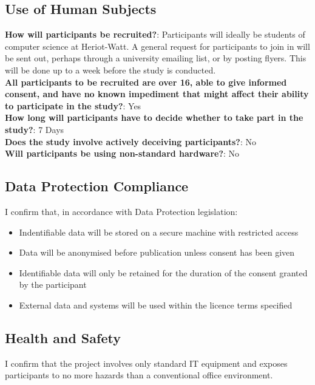 \documentclass[a4paper,11pt]{report}
\begin{document}
\subsection*{Use of Human Subjects}
\textbf{How will participants be recruited?}: Participants will ideally be students of computer science at Heriot-Watt. A general request for participants to join in will be sent out, perhaps through a university emailing list, or by posting flyers. This will be done up to a week before the study is conducted.\\
\textbf{All participants to be recruited are over 16, able to give informed consent, and have no known impediment that might affect their ability to participate in the study?}: Yes\\
\textbf{How long will participants have to decide whether to take part in the study?}: 7 Days\\
\textbf{Does the study involve actively deceiving participants?}: No\\
\textbf{Will participants be using non-standard hardware?}: No

\subsection*{Data Protection Compliance}
I confirm that, in accordance with Data Protection legislation:
\begin{itemize}
\item Indentifiable data will be stored on a secure machine with restricted access
\item Data will be anonymised before publication unless consent has been given
\item Identifiable data will only be retained for the duration of the consent granted by the participant
\item External data and systems will be used within the licence terms specified
\end{itemize}

\subsection*{Health and Safety}
I confirm that the project involves only standard IT equipment and exposes participants to no more hazards than a conventional office environment.


\newpage
{}


\end{document}
